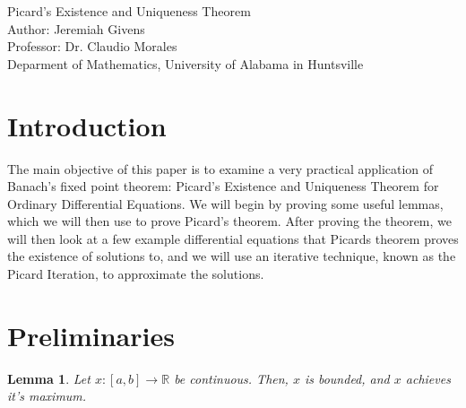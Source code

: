 \documentclass[10pt,a4paper]{article}
\author{Jeremiah Givens}
\theoremstyle{theorem}
\newtheorem{lemma}{Lemma}
\theoremstyle{definition}
\begin{document}

\begin{titlepage}
\vspace*{\fill}
\begin{center}
{\Huge Picard's Existence and Uniqueness Theorem}\\
Author: Jeremiah Givens\\
Professor: Dr. Claudio Morales\\
Deparment of Mathematics, University of Alabama in Huntsville
\end{center}
\vspace*{\fill}
\end{titlepage}

\section{Introduction}
The main objective of this paper is to examine a very practical application of Banach's fixed point theorem: Picard's Existence and Uniqueness Theorem for Ordinary Differential Equations. We will begin by proving some useful lemmas, which we will then use to prove Picard's theorem. After proving the theorem, we will then look at a few example differential equations that Picards theorem proves the existence of solutions to, and we will use an iterative technique, known as the Picard Iteration, to approximate the solutions.

\section{Preliminaries}
\begin{lemma}
Let $x: [a, b] \to \mathbb{R}$ be continuous. Then, $x$ is bounded, and $x$ achieves it's maximum.
\end{lemma}
\end{document}
